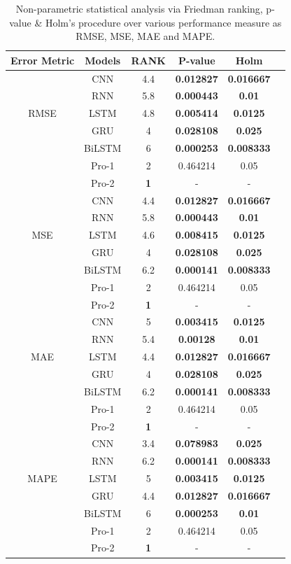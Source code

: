 \documentclass[a4paper, fleqn]{cas-sc}
\begin{document}
\begin{table}[htbp]
    \centering
    \caption{Non-parametric statistical analysis via Friedman ranking,  p-value \& Holm's procedure over various performance measure as RMSE,  MSE,  MAE and MAPE.}
    \begin{tabular}{cccccc}
        \toprule
        Error Metric & Models & RANK & P-value & Holm \\
        \midrule
        \multirow{5}{*}{RMSE} & CNN & 4.4 & \textbf{0.012827} & \textbf{0.016667} \\
        & RNN & 5.8 & \textbf{0.000443} & \textbf{0.01} \\
        & LSTM & 4.8 & \textbf{0.005414} & \textbf{0.0125} \\
        & GRU & 4 & \textbf{0.028108} & \textbf{0.025} \\
        & BiLSTM & 6 & \textbf{0.000253} & \textbf{0.008333} \\
        & Pro-1 & 2  & 0.464214 & 0.05\\
        & Pro-2 & \textbf{1}  & - & -\\
        \midrule
        \multirow{5}{*}{MSE} & CNN & 4.4 & \textbf{0.012827} & \textbf{0.016667} \\
        & RNN & 5.8 & \textbf{0.000443} & \textbf{0.01} \\
        & LSTM & 4.6 & \textbf{0.008415} & \textbf{0.0125} \\
        & GRU & 4 & \textbf{0.028108} & \textbf{0.025} \\
        & BiLSTM & 6.2 & \textbf{0.000141} & \textbf{0.008333} \\
        & Pro-1 & 2 & 0.464214 & 0.05 \\
        & Pro-2 & \textbf{1}  & - & -\\
        \midrule
        \multirow{5}{*}{MAE} & CNN & 5 & \textbf{0.003415} & \textbf{0.0125} \\
        & RNN & 5.4 & \textbf{0.00128} & \textbf{0.01} \\
        & LSTM & 4.4 & \textbf{0.012827} & \textbf{0.016667} \\
        & GRU & 4 & \textbf{0.028108} & \textbf{0.025} \\
        & BiLSTM & 6.2 & \textbf{0.000141} & \textbf{0.008333} \\
        & Pro-1 & 2 & 0.464214 & 0.05 \\
        & Pro-2 & \textbf{1}  & - & -\\
        \midrule
        \multirow{5}{*}{MAPE} & CNN & 3.4 & \textbf{0.078983} & \textbf{0.025} \\
        & RNN & 6.2 & \textbf{0.000141} & \textbf{0.008333} \\
        & LSTM & 5 & \textbf{0.003415} & \textbf{0.0125} \\
        & GRU & 4.4 & \textbf{0.012827} & \textbf{0.016667} \\
        & BiLSTM & 6 & \textbf{0.000253} & \textbf{0.01} \\
        & Pro-1 & 2 & 0.464214 & 0.05 \\
        & Pro-2 & \textbf{1}  & - & -\\
        \bottomrule
    \end{tabular}
    

\end{table}
\end{document}
